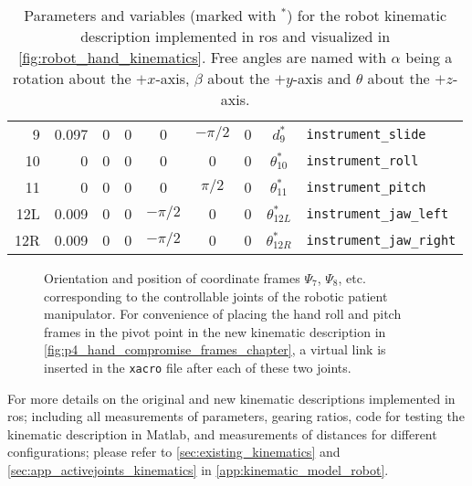 \begin{table}[htbp]
{\begin{tabular}{r | rrr | ccc | c l}
		9 & 0.097 & 0 & 0 & 0 & $-\pi/2$ &  0 & $d_9^*$ & \texttt{instrument\_slide} \\
		10 & 0 & 0 & 0 & 0 & 0 & 0 & $\theta_{10}^*$ & \texttt{instrument\_roll} \\
		11 & 0 & 0 & 0 & 0 & $\pi/2$ & 0 & $\theta_{11}^*$ & \texttt{instrument\_pitch} \\
		12L & 0.009 & 0 & 0 & $-\pi/2$ & 0 & 0 & $\theta_{12L}^*$ & \texttt{instrument\_jaw\_left} \\
		12R & 0.009 & 0 & 0 & $-\pi/2$ & 0 & 0 & $\theta_{12R}^*$ & \texttt{instrument\_jaw\_right} \\
		\end{tabular}\label{tab:new_kin_short}}
	\caption{Parameters and variables (marked with $^*$) for the robot kinematic description implemented in \gls{ros} and visualized in \autoref{fig:robot_hand_kinematics}. Free angles are named with $\alpha$ being a rotation about the $+x$-axis, $\beta$ about the $+y$-axis and $\theta$ about the $+z$-axis.}
	\label{tab:xacro_param_short}
\end{table}



\begin{figure}[htbp]
\hspace*{-15mm}
\begin{minipage}{1.15\textwidth}
	\vspace*{5mm}
	\caption{Orientation and position of coordinate frames $\Psi_7$, $\Psi_8$, etc. corresponding to the controllable joints of the robotic patient manipulator.  For convenience of placing the hand roll and pitch frames in the pivot point in the new kinematic description in \autoref{fig:p4_hand_compromise_frames_chapter}, a virtual link is inserted in the \texttt{xacro} file after each of these two joints.}
	\label{fig:robot_hand_kinematics}
\end{minipage}
\end{figure}
For more details on the original and new kinematic descriptions implemented in \gls{ros}; including all measurements of parameters, gearing ratios, code for testing the kinematic description in Matlab, and measurements of distances for different configurations; please refer to \autoref{sec:existing_kinematics} and \ref{sec:app_activejoints_kinematics} in \autoref{app:kinematic_model_robot}.










